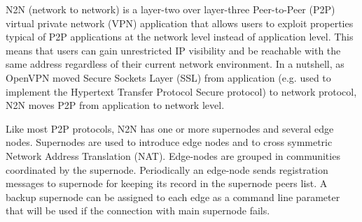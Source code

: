 \onehalfspacing
N2N (network to network)\cite{n2n_paper} is a layer-two over layer-three Peer-to-Peer (P2P) virtual private network (VPN) application that allows users to exploit properties typical of P2P applications at the network level instead of application level. This means that users can gain unrestricted IP visibility and be reachable with the same address regardless of their current network environment. In a nutshell, as OpenVPN moved Secure Sockets Layer (SSL) \cite{tls} from application (e.g. used to implement the Hypertext Transfer Protocol Secure protocol) to network protocol, N2N moves P2P from application to network level.

Like most P2P protocols, N2N has one or more supernodes and several edge nodes. Supernodes are used to introduce edge nodes and to cross symmetric Network Address Translation (NAT). Edge-nodes are grouped in communities coordinated by the supernode. Periodically an edge-node sends registration messages to supernode for keeping its record in the supernode peers list. A backup supernode can be assigned to each edge as a command line parameter that will be used if the connection with main supernode fails.
